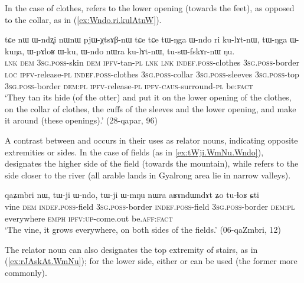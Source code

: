 In the case of clothes,  refers to the lower opening (towards the feet), as opposed to the collar, as in (\ref{ex:Wndo.ri.kulAtnW}).

\begin{exe}
\ex \label{ex:Wndo.ri.kulAtnW}
\gll tɕe nɯ ɯ-ndʐi nɯnɯ pjɯ-χtsɤβ-nɯ tɕe tɕe tɯ-ŋga ɯ-ndo ri ku-lɤt-nɯ, tɯ-ŋga ɯ-kuŋa, ɯ-pɤloʁ ɯ-ku, ɯ-ndo nɯra ku-lɤt-nɯ,  tu-sɯ-fskɤr-nɯ ŋu.   \\
\textsc{lnk} \textsc{dem} \textsc{3sg}.\textsc{poss}-skin \textsc{dem} \textsc{ipfv}-tan-\textsc{pl} \textsc{lnk} \textsc{lnk} \textsc{indef}.\textsc{poss}-clothes \textsc{3sg}.\textsc{poss}-border \textsc{loc} \textsc{ipfv}-release-\textsc{pl} \textsc{indef}.\textsc{poss}-clothes \textsc{3sg}.\textsc{poss}-collar \textsc{3sg}.\textsc{poss}-sleeves \textsc{3sg}.\textsc{poss}-top \textsc{3sg}.\textsc{poss}-border  \textsc{dem}:\textsc{pl}  \textsc{ipfv}-release-\textsc{pl} \textsc{ipfv}-\textsc{caus}-surround-\textsc{pl} be:\textsc{fact} \\
\glt `They tan its hide (of the otter) and put it on the lower opening of the clothes, on the collar of clothes, the cuffs of the sleeves and the lower opening, and make it around (these openings).' (28-qapar, 96)
\end{exe} 


A contrast between  and  occurs in their uses as relator nouns, indicating opposite extremities or sides. In the case of fields (as in \ref{ex:tWji.WmNu.Wndo}),  designates the higher side of the field (towards the mountain), while  refers to the side closer to the river (all arable lands in Gyalrong area lie in narrow valleys).

\begin{exe}
\ex \label{ex:tWji.WmNu.Wndo}
\gll  qaʑmbri nɯ, tɯ-ji ɯ-ndo, tɯ-ji ɯ-mŋu nɯra aʁɤndɯndɤt ʑo tu-ɬoʁ ɕti \\
vine \textsc{dem} \textsc{indef}.\textsc{poss}-field \textsc{3sg}.\textsc{poss}-border \textsc{indef}.\textsc{poss}-field \textsc{3sg}.\textsc{poss}-border \textsc{dem}:\textsc{pl} everywhere \textsc{emph} \textsc{ipfv}:\textsc{up}-come.out be.\textsc{aff}:\textsc{fact} \\
\glt `The vine, it grows everywhere, on both sides of the fields.' (06-qaZmbri, 12)
\end{exe}


The relator noun   can also designates the top extremity of stairs, as in (\ref{ex:rJAskAt.WmNu}); for the lower side, either  or  can be used (the former more commonly).

